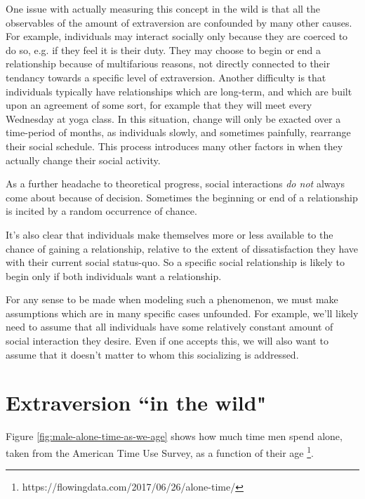 \documentclass[]{article}
\begin{document}
	One issue with actually measuring this concept in the wild is that all the observables of the amount of extraversion are confounded by many other causes. For example, individuals may interact socially only because they are coerced to do so, e.g. if they feel it is their duty. They may choose to begin or end a relationship because of multifarious reasons, not directly connected to their tendancy towards a specific level of extraversion. Another difficulty is that individuals typically have relationships which are long-term, and which are built upon an agreement of some sort, for example that they will meet every Wednesday at yoga class. In this situation, change will only be exacted over a time-period of months, as individuals slowly, and sometimes painfully, rearrange their social schedule. This process introduces many other factors in when they actually change their social activity.
	
	As a further headache to theoretical progress, social interactions \textit{do not} always come about because of decision. Sometimes the beginning or end of a relationship is incited by a random occurrence of chance. 
	
	It's also clear that individuals make themselves more or less available to the chance of gaining a relationship, relative to the extent of dissatisfaction they have with their current social status-quo. So a specific social relationship is likely to begin only if both individuals want a relationship.
	
	For any sense to be made when modeling such a phenomenon, we must make assumptions which are in many specific cases unfounded. For example, we'll likely need to assume that all individuals have some relatively constant amount of social interaction they desire. Even if one accepts this, we will also want to assume that it doesn't matter to whom this socializing is addressed.
	
	\section{Extraversion ``in the wild"}
	Figure \ref{fig:male-alone-time-as-we-age} shows how much time men spend alone, taken from the American Time Use Survey, as a function of their age \footnote{https://flowingdata.com/2017/06/26/alone-time/}.
	
\end{document}
